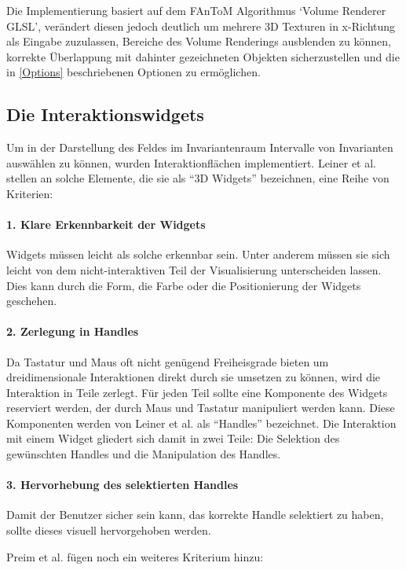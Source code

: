 \documentclass[a4paper,fontsize=12pt,toc=bib,halfparskip,ngerman]{scrartcl}
\begin{document}
Die Implementierung basiert auf dem FAnToM Algorithmus `Volume Renderer GLSL', ver\"andert diesen jedoch deutlich um mehrere 3D Texturen in x-Richtung als Eingabe zuzulassen, Bereiche des Volume Renderings ausblenden zu k\"onnen, korrekte \"Uberlappung mit dahinter gezeichneten Objekten sicherzustellen und die in \cref{Options} beschriebenen Optionen zu erm\"oglichen.

\subsection{Die Interaktionswidgets}
\label{sec:Widget}
Um in der Darstellung des Feldes im Invariantenraum Intervalle von Invarianten ausw\"ahlen zu k\"onnen, wurden Interaktionfl\"achen implementiert. Leiner et al. \cite{leiner1997entwicklung} stellen an solche Elemente, die sie als ``3D Widgets'' bezeichnen, eine Reihe von Kriterien:

\paragraph{1. Klare Erkennbarkeit der Widgets}
Widgets m\"ussen leicht als solche erkennbar sein. Unter anderem m\"ussen sie sich leicht von dem nicht-interaktiven Teil der Visualisierung unterscheiden lassen. Dies kann durch die Form, die Farbe oder die Positionierung der Widgets geschehen.

\paragraph{2. Zerlegung in Handles}
Da Tastatur und Maus oft nicht gen\"ugend Freiheisgrade bieten um dreidimensionale Interaktionen direkt durch sie umsetzen zu k\"onnen, wird die Interaktion in Teile zerlegt. F\"ur jeden Teil sollte eine Komponente des Widgets reserviert werden, der durch Maus und Tastatur manipuliert werden kann. Diese Komponenten werden von Leiner et al. als ``Handles'' bezeichnet. Die Interaktion mit einem Widget gliedert sich damit in zwei Teile: Die Selektion des gew\"unschten Handles und die Manipulation des Handles.

\paragraph{3. Hervorhebung des selektierten Handles}
Damit der Benutzer sicher sein kann, das korrekte Handle selektiert zu haben, sollte dieses visuell hervorgehoben werden.

Preim et al. \cite[S.~340]{preim2015interaktive} f\"ugen noch ein weiteres Kriterium hinzu:
\end{document}
